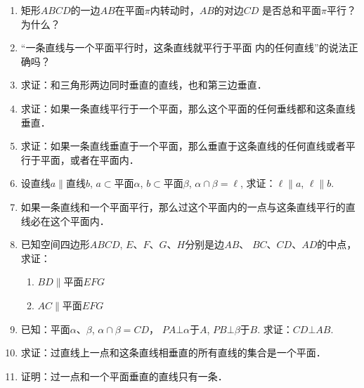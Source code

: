 \begin{enumerate}
  \item 矩形$ABCD$的一边$AB$在平面$\pi$内转动时，$AB$的对边$CD$
  是否总和平面$\pi$平行？为什么？
  \item “一条直线与一个平面平行时，这条直线就平行于平面
  内的任何直线”的说法正确吗？
  \item 求证：和三角形两边同时垂直的直线，也和第三边垂直．
  \item 求证：如果一条直线平行于一个平面，那么这个平面的任何垂线都和这条直线垂直．
  \item 求证：如果一条直线垂直于一个平面，那么垂直于这条直线的任何直线或者平行于平面，或者在平面内．
  \item 设直线$a\parallel$直线$b$, $a\subset$平面$\alpha$, $b\subset$平面$\beta$, $\alpha\cap\beta=\ell$, 求证：$\ell\parallel a$, $\ell\parallel b$.
  \item 如果一条直线和一个平面平行，那么过这个平面内的一点与这条直线平行的直线必在这个平面内．
  \item 已知空间四边形$ABCD$, $E$、$F$、$G$、$H$分别是边$AB$、
  $BC$、$CD$、$AD$的中点，求证：
\begin{enumerate}
  \item $BD\parallel$平面$EFG$
  \item $AC\parallel $平面$EFG$
\end{enumerate}

\item 已知：平面$\alpha$、$\beta$, $\alpha\cap\beta=CD$，
$PA\bot\alpha$于$A$, $PB\bot\beta$于$B$. 求证：$CD\bot AB$.
\item 求证：过直线上一点和这条直线相垂直的所有直线的集合是一个平面．
\item 证明：过一点和一个平面垂直的直线只有一条．

\begin{figure}[htp]
  \centering
  \begin{minipage}[t]{0.48\textwidth}
  \centering
\end{minipage}
\end{figure}
\end{enumerate}
